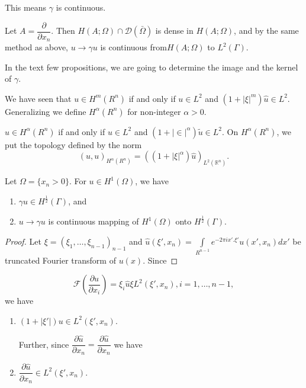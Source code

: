  This means $\gamma$ is continuous.
  \begin{remark*}
    Let $A= \dfrac{\partial}{\partial x_n}$. Then $H(A; \Omega) \cap
    \mathscr{D}(\bar{\Omega})$ is dense in $H(A; \Omega)$, and by the same
    method as above, $u \to \gamma u$ is continuous from\pageoriginale $H(A; \Omega)$ to
    $L^2(\Gamma)$. 
  \end{remark*} 
 
 In the text few propositions, we are going to determine the image and
 the kernel of $\gamma$. 
 
 We have seen that $u \in H^m (R^n)$ if and only if $u
 \in L^2$ and $(1+|\xi|^m)\hat{u} \in
 L^2$. Generalizing we define $H^ \alpha (R^n)$ for non-integer
 $\alpha >0$. 

 \begin{definition}\label{lec4:sec2:subsec4:def2.4}%
   {\em $u \in H^ \alpha (R^n)$} if and only if $u \in
   L^2$ and $(1+|\in|^ \alpha) \tilde{u} \in L^2$. On $H^
   \alpha (R^n)$, we put the topology defined by the norm 
   $$
   (u,u)_{H^\alpha (R^n)}= ((1+|\xi|^ \alpha)
   \hat{u})_{L^2(\mathbb{R}^n)}. 
   $$ 
 \end{definition}

 \begin{theorem}\label{lec4:sec2:subsec4:thm2.6}%
   Let $\Omega =\{ x_n >0 \}$. For $u \in H^1 (\Omega)$, we have 
 \end{theorem} 
 \begin{enumerate}[1)]
 \item $\gamma u \in H^{\frac{1}{2}}(\Gamma)$, and 
 \item $u \to \gamma u$ is continuous mapping of $H^1(\Omega)$
   onto $H^{\frac{1}{2}}(\Gamma)$. 
 \end{enumerate}
 \begin{proof}
   Let $\xi =(\xi_1, \ldots, \xi_{n-1})_{n-1}$
   and $\hat{u}(\xi', x_n)= \int \limits_{R^{n-1}} e^{-2 \pi i
     x'. \xi'}u(x',x_n)dx'$ be truncated Fourier transform of
   $u(x)$. Since 
  \end{proof}  
  $$
  \mathscr{F}\left(\frac{\partial u}{\partial x_i}\right)= \xi _i \hat{u}
  \xi L^2 (\xi' ,x_n), i=1, \ldots ,n-1, 
  $$
   we have 
  \begin{enumerate}[1)]
  \item $(1+ |\xi'|)u \in L^2 (\xi ',x_n)$.

    Further, since $\dfrac{\partial \hat{u}}{\partial
      x_n}=\dfrac{\partial \hat{u}}{\partial x_n}$ we have  
  \item $\dfrac{\partial \hat{u}}{\partial x_n} \in
    L^2(\xi', x_n)$. 
  \end{enumerate} 
  
